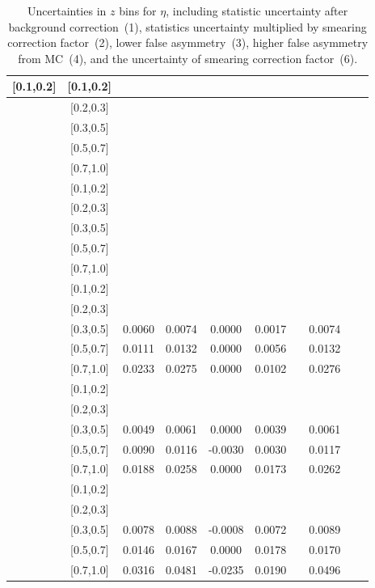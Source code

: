 \begin{table}[H]
\begin{tabular}{|c| c| c| c| c| c| c| c| c| c|}
[0.1,0.2]	&	[0.1,0.2]	&		&		&		&		&		&		\\ \hline
[0.1,0.2]	&	[0.2,0.3]	&		&		&		&		&		&		\\ \hline
[0.1,0.2]	&	[0.3,0.5]	&		&		&		&		&		&		\\ \hline
[0.1,0.2]	&	[0.5,0.7]	&		&		&		&		&		&		\\ \hline
[0.1,0.2]	&	[0.7,1.0]	&		&		&		&		&		&		\\ \hline
[0.2,0.3]	&	[0.1,0.2]	&		&		&		&		&		&		\\ \hline
[0.2,0.3]	&	[0.2,0.3]	&		&		&		&		&		&		\\ \hline
[0.2,0.3]	&	[0.3,0.5]	&		&		&		&		&		&		\\ \hline
[0.2,0.3]	&	[0.5,0.7]	&		&		&		&		&		&		\\ \hline
[0.2,0.3]	&	[0.7,1.0]	&		&		&		&		&		&		\\ \hline
[0.3,0.5]	&	[0.1,0.2]	&		&		&		&		&		&		\\ \hline
[0.3,0.5]	&	[0.2,0.3]	&		&		&		&		&		&		\\ \hline
[0.3,0.5]	&	[0.3,0.5]	&	0.0060	&	0.0074	&	0.0000	&	0.0017	&		&	0.0074	\\ \hline
[0.3,0.5]	&	[0.5,0.7]	&	0.0111	&	0.0132	&	0.0000	&	0.0056	&		&	0.0132	\\ \hline
[0.3,0.5]	&	[0.7,1.0]	&	0.0233	&	0.0275	&	0.0000	&	0.0102	&		&	0.0276	\\ \hline
[0.5,0.7]	&	[0.1,0.2]	&		&		&		&		&		&		\\ \hline
[0.5,0.7]	&	[0.2,0.3]	&		&		&		&		&		&		\\ \hline
[0.5,0.7]	&	[0.3,0.5]	&	0.0049	&	0.0061	&	0.0000	&	0.0039	&		&	0.0061	\\ \hline
[0.5,0.7]	&	[0.5,0.7]	&	0.0090	&	0.0116	&	-0.0030	&	0.0030	&		&	0.0117	\\ \hline
[0.5,0.7]	&	[0.7,1.0]	&	0.0188	&	0.0258	&	0.0000	&	0.0173	&		&	0.0262	\\ \hline
[0.7,1.0]	&	[0.1,0.2]	&		&		&		&		&		&		\\ \hline
[0.7,1.0]	&	[0.2,0.3]	&		&		&		&		&		&		\\ \hline
[0.7,1.0]	&	[0.3,0.5]	&	0.0078	&	0.0088	&	-0.0008	&	0.0072	&		&	0.0089	\\ \hline
[0.7,1.0]	&	[0.5,0.7]	&	0.0146	&	0.0167	&	0.0000	&	0.0178	&		&	0.0170	\\ \hline
[0.7,1.0]	&	[0.7,1.0]	&	0.0316	&	0.0481	&	-0.0235	&	0.0190	&		&	0.0496	\\ \hline
\end{tabular}
\caption{Uncertainties in $z$ bins for $\eta$, including statistic uncertainty after background correction~(1), statistics uncertainty multiplied by smearing correction factor~(2), lower false asymmetry~(3), higher false asymmetry from MC~(4), and the uncertainty of smearing correction factor~(6).}
\label{tab:etaerrors_z}
\end{table}


